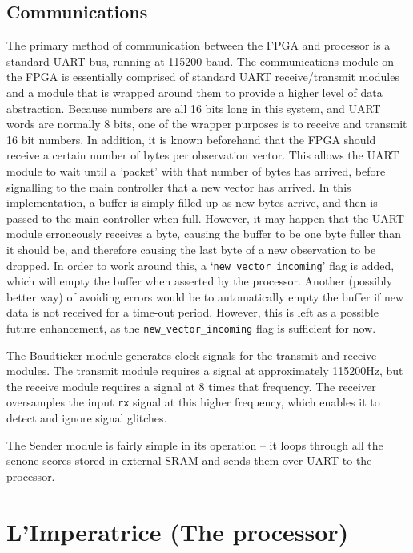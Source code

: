 	\subsection{Communications} %
	\label{sub:fpga_communications}
		The primary method of communication between the FPGA and processor is a standard UART bus, running at 115200 baud.  The communications module on the FPGA is essentially comprised of standard UART receive/transmit modules and a module that is wrapped around them to provide a higher level of data abstraction.  Because numbers are all 16 bits long in this system, and UART words are normally 8 bits, one of the wrapper purposes is to receive and transmit 16 bit numbers.  In addition, it is known beforehand that the FPGA should receive a certain number of bytes per observation vector.  This allows the UART module to wait until a 'packet' with that number of bytes has arrived, before signalling to the main controller that a new vector has arrived.  In this implementation, a buffer is simply filled up as new bytes arrive, and then is passed to the main controller when full.  However, it may happen that the UART module erroneously receives a byte, causing the buffer to be one byte fuller than it should be, and therefore causing the last byte of a new observation to be dropped.  In order to work around this, a `\texttt{new\_vector\_incoming}' flag is added, which will empty the buffer when asserted by the processor.  Another (possibly better way) of avoiding errors would be to automatically empty the buffer if new data is not received for a time-out period.  However, this is left as a possible future enhancement, as the \texttt{new\_vector\_incoming} flag is sufficient for now.

		The Baudticker module generates clock signals for the transmit and receive modules.  The transmit module requires a signal at approximately 115200Hz, but the receive module requires a signal at 8 times that frequency.  The receiver oversamples the input \texttt{rx} signal at this higher frequency, which enables it to detect and ignore signal glitches.  %

		The Sender module is fairly simple in its operation -- it loops through all the senone scores stored in external SRAM and sends them over UART to the processor.



\section{L'Imperatrice (The processor)} %
\label{sec:l_imperatrice_processor}

